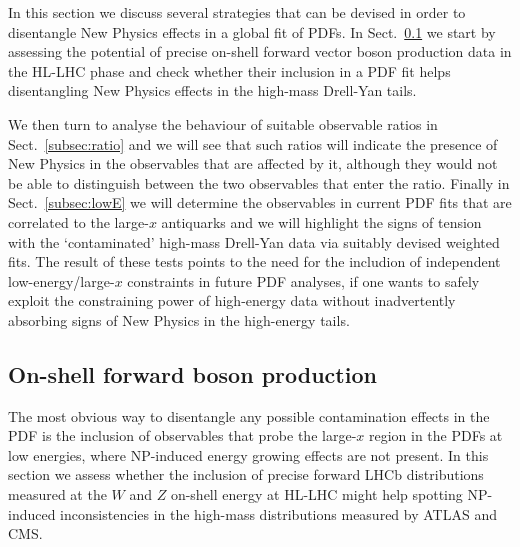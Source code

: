 \documentclass[withindex,glossary]{cam-thesis}
\begin{document}
In this section we discuss several strategies that can be devised in order to disentangle 
New Physics effects in a global fit of PDFs. In Sect.~\ref{subsec:forward} we start by 
assessing the potential of precise on-shell forward vector boson production 
data in the HL-LHC phase and check whether their inclusion in a PDF fit helps disentangling 
New Physics effects in the high-mass Drell-Yan tails. 

We then turn to analyse the behaviour of suitable observable ratios in Sect.~\ref{subsec:ratio} and we will see that such ratios will indicate the 
presence of New Physics in the observables that are affected by it, although they would not be able to distinguish between the two observables that 
enter the ratio. Finally in Sect.~\ref{subsec:lowE} we will determine the  observables in current PDF fits that are correlated to the 
large-$x$ antiquarks and we will highlight the signs of tension with the `contaminated' high-mass Drell-Yan data via suitably devised weighted fits. 
The result of these tests points to the need for the includion of independent low-energy/large-$x$ constraints in future PDF analyses, 
if one wants to safely exploit the constraining power of high-energy data without inadvertently absorbing signs of New Physics 
in the high-energy tails. 


\subsection{On-shell forward boson production}
\label{subsec:forward}
The most obvious way to disentangle any possible contamination effects in the PDF is the inclusion 
of observables that probe the large-$x$ region in the PDFs at low energies, where NP-induced energy growing effects are not present.  
In this section we assess whether the inclusion of precise forward LHCb distributions measured at the $W$ and $Z$ on-shell energy 
at HL-LHC might help spotting NP-induced inconsistencies in the high-mass distributions measured by ATLAS and CMS. 
\end{document}
